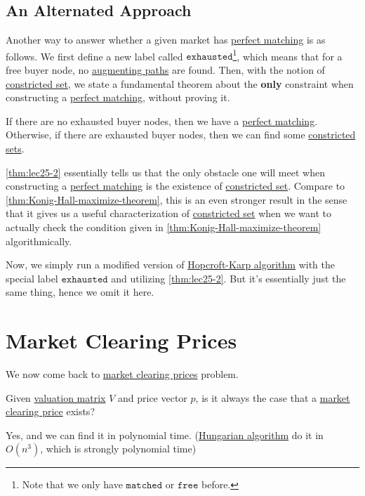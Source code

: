 \subsection{An Alternated Approach}
Another way to answer whether a given market has \hyperref[def:perfect-matching]{perfect matching} is as follows.
We first define a new label called \(\mathtt{exhausted}\)\footnote{Note that we only have \(\mathtt{matched}\) or \(\mathtt{free}\) before.},
which means that for a free buyer node, no \hyperref[def:augmenting-path]{augmenting paths} are found.
Then, with the notion of \hyperref[def:constricted-set]{constricted set}, we state a fundamental theorem about the \textbf{only} constraint when constructing
a \hyperref[def:perfect-matching]{perfect matching}, without proving it.
\begin{theorem}\label{thm:lec25-2}
	If there are no exhausted buyer nodes, then we have a \hyperref[def:perfect-matching]{perfect matching}. Otherwise, if there are exhausted buyer nodes, then we
	can find some \hyperref[def:constricted-set]{constricted sets}.
\end{theorem}

\begin{remark}
	\autoref{thm:lec25-2} essentially tells us that the only obstacle one will meet when constructing a \hyperref[def:perfect-matching]{perfect matching}
	is the existence of \hyperref[def:constricted-set]{constricted set}. Compare to \autoref{thm:Konig-Hall-maximize-theorem}, this is an even stronger
	result in the sense that it gives us a useful characterization of \hyperref[def:constricted-set]{constricted set} when we want to actually check the
	condition given in \autoref{thm:Konig-Hall-maximize-theorem} algorithmically.
\end{remark}

Now, we simply run a modified version of \hyperref[algo:Hopcroft-Karp-algorithm]{Hopcroft-Karp algorithm} with the special label \(\mathtt{exhausted}\) and
utilizing \autoref{thm:lec25-2}. But it's essentially just the same thing, hence we omit it here.

\section{Market Clearing Prices}
We now come back to \hyperref[note:market-clearing-prices]{market clearing prices} problem.

\begin{problem}
Given \hyperref[def:valuation-matrix]{valuation matrix} \(V\) and price vector \(p\), is it always the case that a
\hyperref[note:market-clearing-prices]{market clearing price} exists?
\end{problem}
\begin{answer}
	Yes, and we can find it in polynomial time. (\href{https://en.wikipedia.org/wiki/Hungarian_algorithm}{Hungarian algorithm}
	do it in \(O(n^{3})\), which is strongly polynomial time)
\end{answer}

